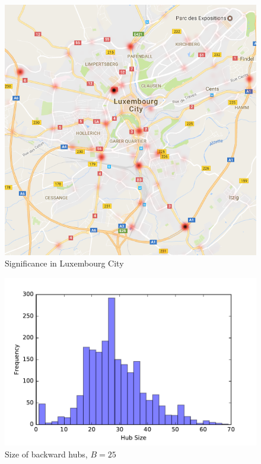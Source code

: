 \begin{figure}\label{fig:map_LU} \caption{Significance in Luxembourg City}
\begin{center}
\includegraphics[scale=0.37]{TexImg/map_LU_sig.png}
\end{center}
\end{figure}

\begin{figure}\label{fig:SF_bwd_size} \caption{Size of backward hubs, $B=25$}
\begin{center}
\includegraphics[scale=0.5]{TexImg/SF_bwd_hub_size.pdf}
\end{center}
\end{figure}

